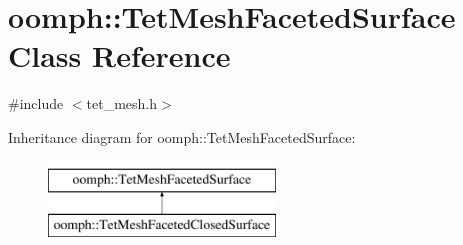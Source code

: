 \hypertarget{classoomph_1_1TetMeshFacetedSurface}{}\section{oomph\+:\+:Tet\+Mesh\+Faceted\+Surface Class Reference}
\label{classoomph_1_1TetMeshFacetedSurface}


{\ttfamily \#include $<$tet\+\_\+mesh.\+h$>$}

Inheritance diagram for oomph\+:\+:Tet\+Mesh\+Faceted\+Surface\+:\begin{figure}[H]
\begin{center}
\leavevmode
\includegraphics[height=2.000000cm]{classoomph_1_1TetMeshFacetedSurface}
\end{center}
\end{figure}
